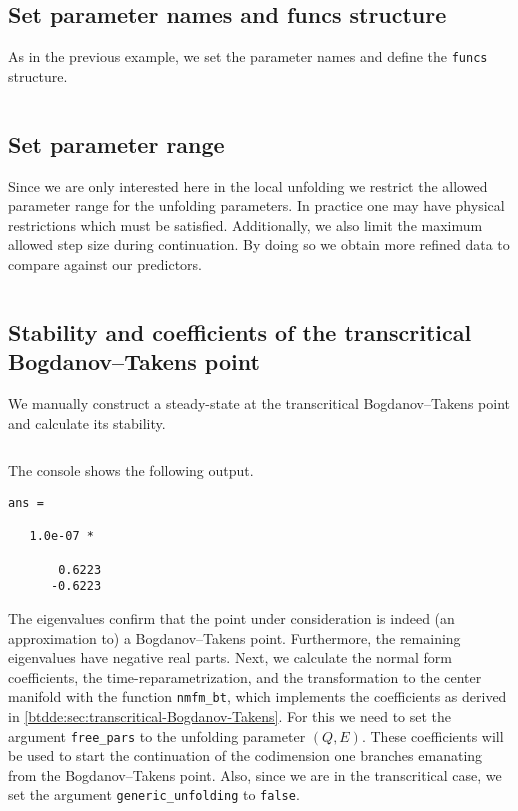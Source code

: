 \subsection{Set parameter names and funcs structure}
\label{sm:sec:vpdo:pars_and_funcs}
As in the previous example, we set the parameter names and define the \texttt{funcs} structure.
\inputminted[firstline=31, lastline=37]{MATLAB}{\pathToDDEBifToolDemos/vdpo_bt_transcritical/vanderPolOscillator.m}

\subsection{Set parameter range}
Since we are only interested here in the local unfolding we restrict the
allowed parameter range for the unfolding parameters. In practice one may have
physical restrictions which must be satisfied. Additionally, we also limit the
maximum allowed step size during continuation. By doing so we obtain more refined
data to compare against our predictors.
\inputminted[firstline=39, lastline=42]{MATLAB}{\pathToDDEBifToolDemos/vdpo_bt_transcritical/vanderPolOscillator.m}

\subsection{Stability and coefficients of the transcritical Bogdanov--Takens point}
We manually construct a steady-state at the transcritical Bogdanov--Takens
point and calculate its stability.
\inputminted[firstline=44, lastline=55]{MATLAB}{\pathToDDEBifToolDemos/vdpo_bt_transcritical/vanderPolOscillator.m}

The \MATLAB console shows the following output.
\begin{verbatim}
ans =

   1.0e-07 *

       0.6223
      -0.6223

\end{verbatim}
The eigenvalues confirm that the point under consideration is indeed (an
approximation to) a Bogdanov--Takens point. Furthermore, the remaining eigenvalues have
negative real parts. Next, we calculate the normal form coefficients, the
time-reparametrization, and the transformation to the center manifold with the
function \texttt{nmfm_bt}, which implements the coefficients as derived in
\cref{btdde:sec:transcritical-Bogdanov-Takens}. For this we need to set the argument
\texttt{free_pars} to the unfolding parameter $(Q,E)$. These
coefficients will be used to start the continuation of the codimension one branches
emanating from the Bogdanov--Takens point. Also, since we are in the transcritical case,
we set the argument \texttt{generic_unfolding} to \texttt{false}.
\inputminted[firstline=57, lastline=60]{MATLAB}{\pathToDDEBifToolDemos/vdpo_bt_transcritical/vanderPolOscillator.m}


